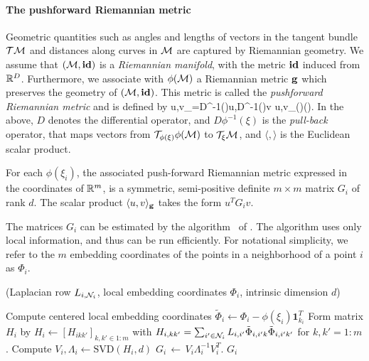 \paragraph{The pushforward Riemannian metric} Geometric quantities such as angles and lengths of vectors in the tangent bundle ${\cal T}{\cal M}$ and distances along curves in ${\cal M}$ are captured by Riemannian geometry. We assume that $({\cal M},\mathbf{id})$ is a {\em Riemannian manifold}, with the metric $\mathbf{id}$ induced from ${\mathbb R}^D$. Furthermore, we associate with $\phi({\cal M})$ a Riemannian metric $\mathbf{g}$ which preserves the geometry of $({\cal M},\mathbf{id})$. This metric is called the {\em pushforward Riemannian metric} and is defined by
\beq \label{eq:rmetric0}
\langle u,v\rangle_{\g}\;=\;\langle D\phi^{-1}(\xi)u,D\phi^{-1}(\xi)v\rangle
\quad{}u,v\in\T_{\phi(\xi)}\phi(\M).
\eeq
In the above, $D$ denotes the differential operator, and $D\phi^{-1}(\xi)$ is the {\em pull-back} operator, that maps vectors from ${\cal T}_{\phi(\xi)}\phi({\cal M})$ to ${\cal T}_\xi{\cal M}$, and $\langle , \rangle$ is the Euclidean scalar product. 

For each $\phi(\xi_i)$, the associated push-forward Riemannian metric
expressed in the coordinates of ${\mathbb R}^m$, is a symmetric,
semi-positive definite $m\times m$ matrix $G_i$ of rank $d$. The scalar product $\langle u,v \rangle_{\mathbf{g}}$ takes the form $u^TG_iv$.

The matrices $G_i$ can be estimated by the algorithm \rmalg~of
\citet{2013arXiv1305.7255P}. The algorithm uses only local information, and thus can be run
efficiently. For notational simplicity, we refer to the $m$ embedding
coordinates of the points in a neighborhood of a point $i$ as
$\Phi_{i}$.
%
\begin{algorithm}[H]
\renewcommand{\thealgorithm}{}
\caption{(Laplacian row $L_{i, {\cal N}_i}$, local embedding coordinates $\Phi_{i}$, intrinsic dimension $d$)}
\begin{algorithmic}[1]
\STATE Compute centered local embedding coordinates $\tilde \Phi_i \gets \Phi_{i} - \phi(\xi_i)\bm{1}_{k_i}^T  $
\STATE %
Form matrix $H_i$ by $H_i \gets [H_{ikk'}]_{k,k' \in 1:m}$ with 
 $H_{i,kk'}=\sum_{i'\in {\cal N}_i}L_{i,i'}\tilde \Phi_{i,i'k} \tilde \Phi_{i,i'k'}$ for $k,k'=1:m$. 
  \STATE  Compute $V_i, \Lambda_i \gets \text{SVD} (H_i, d)$
    \STATE $G_i\,\gets\,V_i \Lambda_i^{-1} V_i^T$.
   $G_i$
\end{algorithmic}
\end{algorithm}
%

